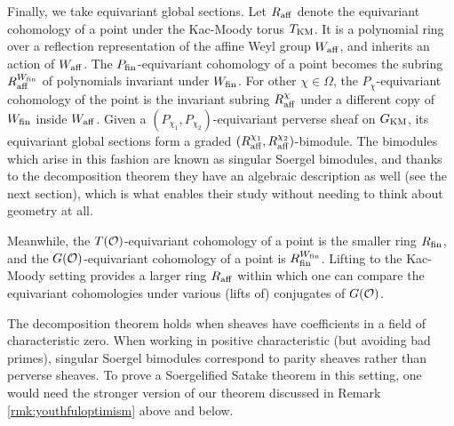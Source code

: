 {Finally, we take equivariant global sections. Let $R_{\operatorname{aff}}$ denote the equivariant cohomology of a point under the Kac-Moody torus $T_{\operatorname{KM}}$. It is a polynomial ring over a  reflection representation of the affine Weyl group $W_{\operatorname{aff}}$, and inherits an action of $W_{\operatorname{aff}}$. The $P_{\operatorname{fin}}$-equivariant cohomology of a point becomes the subring $R_{\operatorname{aff}}^{W_{\operatorname{fin}}}$ of polynomials invariant under $W_{\operatorname{fin}}$. For other $\chi \in \Omega$, the $P_{\chi}$-equivariant cohomology of the point is the invariant subring $R_{\operatorname{aff}}^{\chi}$ under a different copy of $W_{\operatorname{fin}}$ inside $W_{\operatorname{aff}}$. Given a $(P_{\chi_1},P_{\chi_2})$-equivariant perverse sheaf on $G_{\operatorname{KM}}$, its equivariant global sections form a graded $(R_{\operatorname{aff}}^{\chi_1},R_{\operatorname{aff}}^{\chi_2})$-bimodule. The bimodules which arise in this fashion are known as singular Soergel bimodules, and thanks to the decomposition theorem they have an algebraic description as well (see the next section), which is what enables their study without needing to think about geometry at all.

\begin{remark} Meanwhile, the $T(\mathcal{O})$-equivariant cohomology of a point is the smaller ring $R_{\operatorname{fin}}$, and the $G(\mathcal{O})$-equivariant cohomology of a point is $R_{\operatorname{fin}}^{W_{\operatorname{fin}}}$. Lifting to the Kac-Moody setting provides a larger ring $R_{\operatorname{aff}}$ within which one can compare the equivariant cohomologies under various (lifts of) conjugates of $G(\mathcal{O})$.\end{remark}

\begin{remark}  The decomposition theorem holds when sheaves have coefficients in a field of characteristic zero. When working in positive characteristic (but avoiding bad primes), singular Soergel bimodules correspond to parity sheaves  rather than perverse sheaves. To prove a Soergelified Satake theorem in this setting, one would need the stronger version of our theorem discussed in Remark \ref{rmk:youthfuloptimism} above and  below. \end{remark}




}
